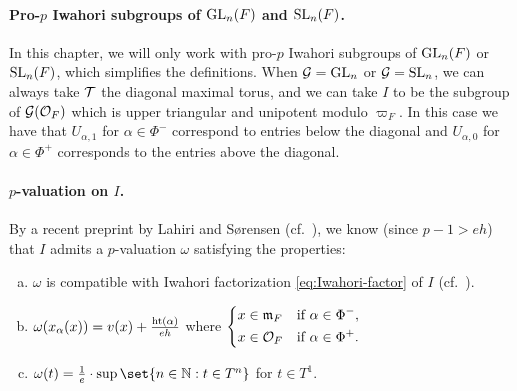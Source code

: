 \paragraph{Pro-$p$ Iwahori subgroups of $\operatorname{GL}_{n}(F)$ and $\operatorname{SL}_{n}(F)$.} In this chapter, we will only work with pro-$p$ Iwahori subgroups of $\operatorname{GL}_{n}(F)$ or $\operatorname{SL}_{n}(F)$, which simplifies the definitions. When $\mathcal{G} = \operatorname{GL}_{n}$ or $\mathcal{G} = \operatorname{SL}_{n}$, we can always take $\mathcal{T}$ the diagonal maximal torus, and we can take $I$ to be the subgroup of $\mathcal{G}(\mathcal{O}_{F})$ which is upper triangular and unipotent modulo $\varpi_{F}$. In this case we have that $U_{\alpha,1}$ for $\alpha \in \Phi^{-}$ correspond to entries below the diagonal and $U_{\alpha,0}$ for $\alpha \in \Phi^{+}$ corresponds to the entries above the diagonal.

\paragraph{$p$-valuation on $I$.} By a recent preprint by Lahiri and Sørensen (cf.\ \cite[Prop.~3.4]{IwaBasis}), we know (since $p-1 > eh$) that $I$ admits a $p$-valuation $\omega$ satisfying the properties:
\begin{enumerate}[(a)]
  \item $\omega$ is compatible with Iwahori factorization \eqref{eq:Iwahori-factor} of $I$ (cf.\ \cite[Def.~3.3]{IwaBasis}).
  \item $\omega(x_{\alpha}(x)) = v(x) + \frac{\operatorname{ht}(\alpha)}{eh}$ where $\begin{dcases}
    x \in \mathfrak{m}_{F} & \text{if } \alpha \in \Phi^{-}, \\
    x \in \mathcal{O}_{F} & \text{if } \alpha \in \Phi^{+}.
  \end{dcases}$
  \item $\omega(t) = \frac{1}{e} \cdot \sup\set{n \in \N : t \in T^{n}}$ for $t \in T^{1}$.
\end{enumerate}

